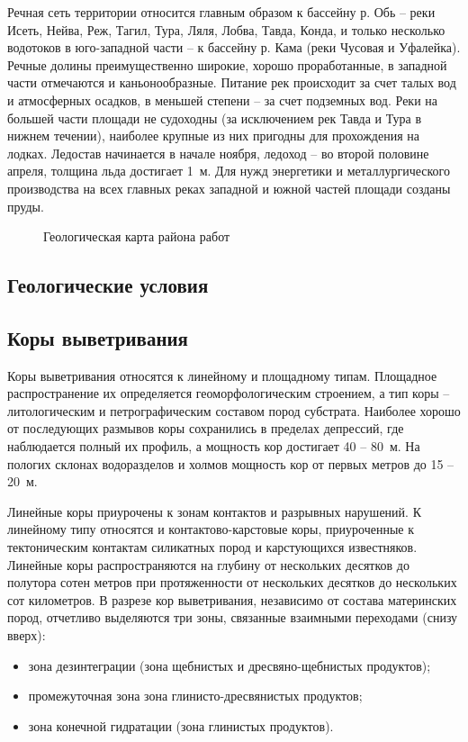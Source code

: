 Речная сеть территории относится главным образом к бассейну р. Обь  --  реки Исеть, Нейва, Реж, Тагил, Тура, Ляля, Лобва, Тавда, Конда, и только несколько водотоков в юго-западной части  --  к бассейну р. Кама (реки Чусовая и Уфалейка). Речные долины преимущественно широкие, хорошо проработанные, в западной части отмечаются и каньонообразные. Питание рек происходит за счет талых вод и атмосферных осадков, в меньшей степени  --  за счет подземных вод. Реки на большей части площади не судоходны (за исключением рек Тавда и Тура в нижнем течении), наиболее крупные из них пригодны для прохождения на лодках. Ледостав начинается в начале ноября, ледоход  --  во второй половине апреля, толщина льда достигает 1~м. Для нужд энергетики и металлургического производства на всех
главных реках западной и южной частей площади созданы пруды.

\begin{figure}[h]
	\caption{Геологическая карта района работ}
\end{figure}

\subsection*{Геологические условия}
\txtGeology

\subsection*{Коры выветривания}
Коры выветривания относятся к линейному и площадному типам. Площадное распространение их определяется геоморфологическим строением, а тип коры  --  литологическим и петрографическим составом пород субстрата. Наиболее хорошо от последующих размывов коры сохранились в пределах депрессий, где наблюдается полный их профиль, а  мощность кор достигает 40  --  80~м. На пологих склонах водоразделов и холмов мощность кор от первых метров до 15 -- 20~м.

Линейные коры приурочены к зонам контактов и разрывных нарушений. К линейному типу относятся и контактово-карстовые коры, приуроченные к тектоническим контактам силикатных пород и карстующихся
известняков. Линейные коры распространяются на глубину от нескольких десятков до полутора сотен метров при протяженности от нескольких десятков до нескольких сот километров. В разрезе кор выветривания, независимо от состава материнских пород, отчетливо выделяются три зоны, связанные взаимными переходами (снизу вверх): 
\begin{itemize}
\item зона дезинтеграции (зона щебнистых и дресвяно-щебнистых продуктов);
\item промежуточная зона зона глинисто-дресвянистых продуктов;
\item зона конечной гидратации (зона глинистых продуктов).
\end{itemize}


